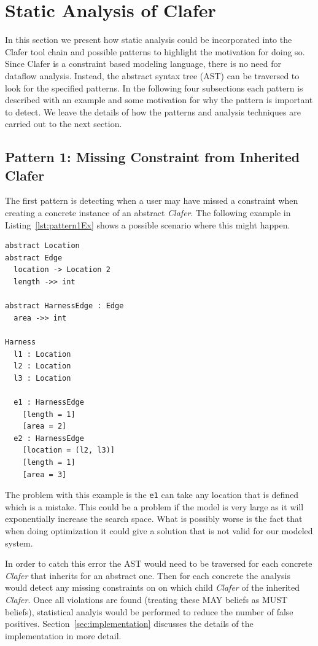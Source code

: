 \documentclass[10pt,oneside]{IEEEtran}
\begin{document}
\section{Static Analysis of Clafer}
In this section we present how static analysis could be incorporated into the Clafer tool chain and possible patterns to highlight the motivation for doing so. Since Clafer is a constraint based modeling language, there is no need for dataflow analysis. Instead, the abstract syntax tree (AST) can be traversed to look for the specified patterns. In the following four subsections each pattern is described with an example and some motivation for why the pattern is important to detect. We leave the details of how the patterns and analysis techniques are carried out to the next section.%

\subsection{Pattern 1: Missing Constraint from Inherited Clafer}
The first pattern is detecting when a user may have missed a constraint when creating a concrete instance of an abstract \textit{Clafer}. The following example in Listing~\ref{lst:pattern1Ex} shows a possible scenario where this might happen.
\begin{lstlisting}[label={lst:pattern1Ex},caption={Example of Pattern 1}]
abstract Location
abstract Edge
  location -> Location 2
  length ->> int

abstract HarnessEdge : Edge
  area ->> int

Harness
  l1 : Location
  l2 : Location
  l3 : Location

  e1 : HarnessEdge
    [length = 1]
    [area = 2]
  e2 : HarnessEdge
    [location = (l2, l3)]
    [length = 1]
    [area = 3]
\end{lstlisting}
The problem with this example is the \lstinline$e1$ can take any location that is defined which is a mistake. This could be a problem if the model is very large as it will exponentially increase the search space. What is possibly worse is the fact that when doing optimization it could give a solution that is not valid for our modeled system.

In order to catch this error the AST would need to be traversed for each concrete \textit{Clafer} that inherits for an abstract one. Then for each concrete the analysis would detect any missing constraints on on which child \textit{Clafer} of the inherited \textit{Clafer}. Once all violations are found (treating these MAY beliefs as MUST beliefs), statistical analyis would be performed to reduce the number of false positives. Section~\ref{sec:implementation} discusses the details of the implementation in more detail.
\end{document}
